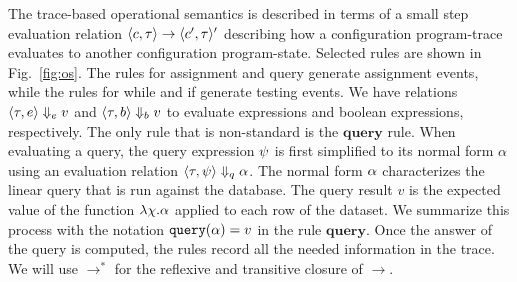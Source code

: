 The trace-based operational semantics is described in terms of a small step evaluation relation
$\langle c, \mathtt{\tau} \rangle \to \langle c', \mathtt{\tau} \rangle'$  describing how a configuration program-trace evaluates to another
configuration program-state. Selected rules are shown in Fig.~\ref{fig:os}.
The rules for assignment and query generate assignment events, while the rules for while and if generate testing events. 
We have relations $\langle \mathtt{\tau}, e \rangle \Downarrow_e v $  and $\langle \mathtt{\tau}, b \rangle \Downarrow_b v $  to evaluate expressions and boolean expressions, respectively. 
The only rule that is non-standard is the $\textbf{query}$ rule. When evaluating a query, the query expression $\psi$ is first simplified to its normal form $\alpha$ using an evaluation relation $\langle \mathtt{\tau}, \psi \rangle \Downarrow_q \alpha$. 
The normal form $\alpha$ characterizes the linear query that is run against the database. The query result $v$ is the expected value of the function $\lambda \chi.\alpha$ applied to each row of the dataset. We summarize this process with the notation ${\tt query}(\alpha) = v$ in the rule $\textbf{query}$. 
Once the answer of the query is computed, the rules record all the needed information in the trace.  We will use $\to^*$ for the reflexive and transitive closure of $\to$. 
